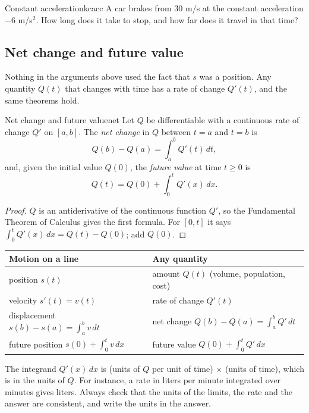 \documentclass[11pt]{article}
\begin{document}
\begin{kc}{Constant acceleration}{kcacc}
A car brakes from $30$ m/s at the constant acceleration $-6$ m/s$^2$. How long does it take to stop, and how far does it travel in that time?
\end{kc}

\subsection*{Net change and future value}

Nothing in the arguments above used the fact that $s$ was a position. Any quantity $Q(t)$ that changes with time has a rate of change $Q'(t)$, and the same theorems hold.

\begin{thm}{Net change and future value}{net}
Let $Q$ be differentiable with a continuous rate of change $Q'$ on $[a,b]$. The \emph{net change} in $Q$ between $t=a$ and $t=b$ is
\[
Q(b)-Q(a)=\int_a^bQ'(t)\,dt ,
\]
and, given the initial value $Q(0)$, the \emph{future value} at time $t\ge0$ is
\[
Q(t)=Q(0)+\int_0^tQ'(x)\,dx .
\]
\end{thm}
\begin{proof}
$Q$ is an antiderivative of the continuous function $Q'$, so the Fundamental Theorem of Calculus gives the first formula. For $[0,t]$ it says $\int_0^tQ'(x)\,dx=Q(t)-Q(0)$; add $Q(0)$.
\end{proof}

\begin{center}
\begin{tabular}{@{}ll@{}}
\toprule
Motion on a line & Any quantity\\
\midrule
position $s(t)$ & amount $Q(t)$ (volume, population, cost)\\
velocity $s'(t)=v(t)$ & rate of change $Q'(t)$\\
displacement $s(b)-s(a)=\int_a^bv\,dt$ & net change $Q(b)-Q(a)=\int_a^bQ'\,dt$\\
future position $s(0)+\int_0^tv\,dx$ & future value $Q(0)+\int_0^tQ'\,dx$\\
\bottomrule
\end{tabular}
\end{center}

\begin{warn}[Units]
The integrand $Q'(x)\,dx$ is (units of $Q$ per unit of time)$\,\times\,$(units of time), which is in the units of $Q$. For instance, a rate in liters per minute integrated over minutes gives liters. Always check that the units of the limits, the rate and the answer are consistent, and write the units in the answer.
\end{warn}
\end{document}
